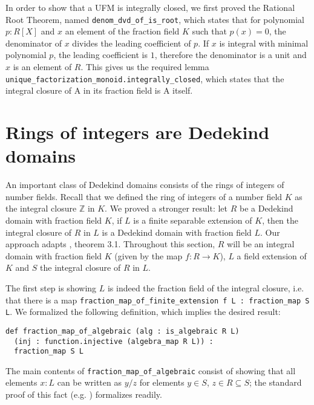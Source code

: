 \documentclass[a4paper,USenglish,cleveref, autoref, thm-restate]{lipics-v2021}
\newcommand{\lean}[1]{\texttt{#1}\xspace} %
\newcommand{\Z}{\mathbb{Z}}
\begin{document}
In order to show that a UFM is integrally closed, we first proved the Rational Root Theorem, named \lean{denom\_dvd\_of\_is\_root},
which states that for polynomial $p : R[X]$ and $x$ an element of the fraction field $K$ such that $p(x) = 0$, the denominator of $x$ divides the leading coefficient of $p$.
If $x$ is integral with minimal polynomial $p$, the leading coefficient is $1$, therefore the denominator is a unit and $x$ is an element of $R$.
This gives us the required lemma \lean{unique\_factorization\_monoid.integrally\_closed}, which states that the integral closure of A in its fraction field is A itself.

\section{Rings of integers are Dedekind domains} \label{sec:integral-closure}

An important class of Dedekind domains consists of the rings of integers of number fields.
Recall that we defined the ring of integers of a number field $K$ as the integral closure $\Z$ in $K$.
We proved a stronger result: let $R$ be a Dedekind domain with fraction field $K$, if $L$ is a finite separable extension of $K$, then the integral closure of $R$ in $L$ is a Dedekind domain with fraction field $L$.
Our approach adapts \cite{Neukirch}, theorem 3.1.
Throughout this section, $R$ will be an integral domain with fraction field $K$ (given by the map $f : R \to K$), $L$ a field extension of $K$ and $S$ the integral closure of $R$ in $L$.

The first step is showing $L$ is indeed the fraction field of the integral closure,
i.e. that there is a map \lean{fraction\_map\_of\_finite\_extension f L : fraction\_map S L}.
We formalized the following definition, which implies the desired result:
\begin{lstlisting}
def fraction_map_of_algebraic (alg : is_algebraic R L)
  (inj : function.injective (algebra_map R L)) :
  fraction_map S L
\end{lstlisting}
The main contents of \lean{fraction\_map\_of\_algebraic} consist of showing that all elements $x : L$ can be written as $y / z$ for elements $y \in S$, $z \in R \subseteq S$;
the standard proof of this fact (e.g. \cite[Theorem 15.29]{Dummit-and-Foote}) formalizes readily.
\end{document}
